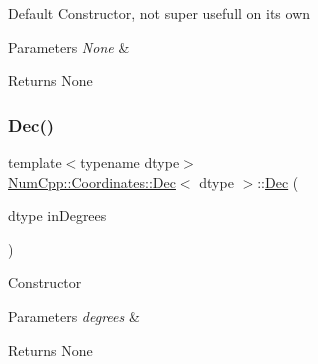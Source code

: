 Default Constructor, not super usefull on its own


\begin{DoxyParams}{Parameters}
{\em None} & \\
\hline
\end{DoxyParams}
\begin{DoxyReturn}{Returns}
None 
\end{DoxyReturn}
\mbox{\label{class_num_cpp_1_1_coordinates_1_1_dec_aab887730681c569abf8a3588ed5adef4}} 
\subsubsection{\texorpdfstring{Dec()}{Dec()}\hspace{0.1cm}{\footnotesize\ttfamily [2/3]}}
{\footnotesize\ttfamily template$<$typename dtype$>$ \\
\mbox{\hyperlink{class_num_cpp_1_1_coordinates_1_1_dec}{Num\+Cpp\+::\+Coordinates\+::\+Dec}}$<$ dtype $>$\+::\mbox{\hyperlink{class_num_cpp_1_1_coordinates_1_1_dec}{Dec}} (\begin{DoxyParamCaption}\item[{dtype}]{in\+Degrees }\end{DoxyParamCaption})\hspace{0.3cm}{\ttfamily [inline]}}

Constructor


\begin{DoxyParams}{Parameters}
{\em degrees} & \\
\hline
\end{DoxyParams}
\begin{DoxyReturn}{Returns}
None 
\end{DoxyReturn}
\mbox{\label{class_num_cpp_1_1_coordinates_1_1_dec_a1e26af1eea1f505f32a5761767ef9ed3}} 
